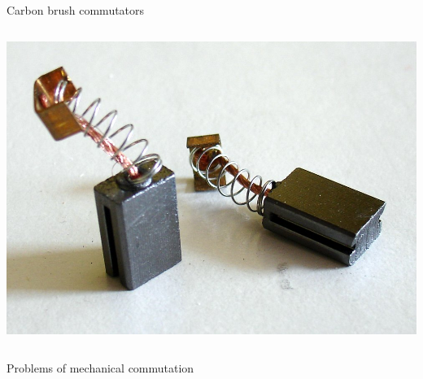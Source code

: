 \documentclass[compress]{beamer}
\begin{document}
\begin{frame}{Carbon brush commutators}
\begin{columns}
\begin{column}{0.4\linewidth}
\begin{center}
                \vspace{2em}
                \includegraphics[width=0.8\linewidth]{image23}
            \end{center}
        \end{column}
    \end{columns}


\end{frame}

{
\begin{frame}{Problems of mechanical commutation}

%
%

\end{frame}
}
\end{document}
